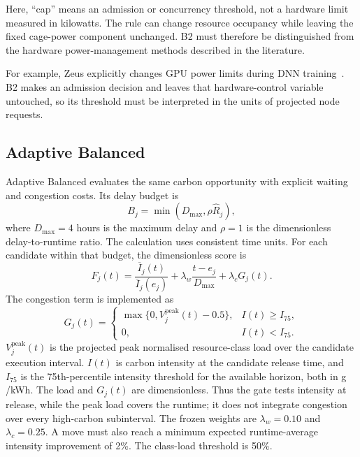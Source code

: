 Here, ``cap'' means an admission or concurrency threshold, not a hardware limit measured in kilowatts. The rule can change resource occupancy while leaving the fixed cage-power component unchanged. B2 must therefore be distinguished from the hardware power-management methods described in the literature.

For example, Zeus explicitly changes GPU power limits during DNN training~\cite{you2023zeus}. B2 makes an admission decision and leaves that hardware-control variable untouched, so its threshold must be interpreted in the units of projected node requests.

\subsection{Adaptive Balanced}
Adaptive Balanced evaluates the same carbon opportunity with explicit waiting and congestion costs. Its delay budget is
\begin{equation}
B_j=\min(D_{\max},\rho\widehat R_j),
\end{equation}
where $D_{\max}=4$ hours is the maximum delay and $\rho=1$ is the dimensionless delay-to-runtime ratio. The calculation uses consistent time units. For each candidate within that budget, the dimensionless score is
\begin{equation}\label{eq:adaptive}
F_j(t)=\frac{\overline I_j(t)}{\overline I_j(e_j)}
+\lambda_w\frac{t-e_j}{D_{\max}}+\lambda_c G_j(t).
\end{equation}
The congestion term is implemented as
\begin{equation}\label{eq:adaptive-congestion}
G_j(t)=\begin{cases}
\max\{0,V_j^{\mathrm{peak}}(t)-0.5\}, & I(t)\ge I_{75},\\
0, & I(t)<I_{75}.
\end{cases}
\end{equation}
$V_j^{\mathrm{peak}}(t)$ is the projected peak normalised resource-class load over the candidate execution interval. $I(t)$ is carbon intensity at the candidate release time, and $I_{75}$ is the 75th-percentile intensity threshold for the available horizon, both in g \co/kWh. The load and $G_j(t)$ are dimensionless. Thus the gate tests intensity at release, while the peak load covers the runtime; it does not integrate congestion over every high-carbon subinterval. The frozen weights are $\lambda_w=0.10$ and $\lambda_c=0.25$. A move must also reach a minimum expected runtime-average intensity improvement of 2\%. The class-load threshold is 50\%.

